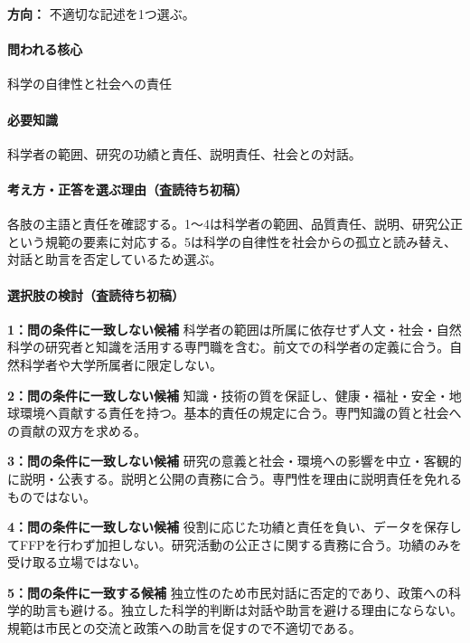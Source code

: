 \noindent\textbf{方向：} 不適切な記述を1つ選ぶ。\par

\paragraph{問われる核心} 科学の自律性と社会への責任

\paragraph{必要知識} 科学者の範囲、研究の功績と責任、説明責任、社会との対話。

\paragraph{考え方・正答を選ぶ理由（査読待ち初稿）} 各肢の主語と責任を確認する。1〜4は科学者の範囲、品質責任、説明、研究公正という規範の要素に対応する。5は科学の自律性を社会からの孤立と読み替え、対話と助言を否定しているため選ぶ。

\paragraph{選択肢の検討（査読待ち初稿）}\mbox{}\par

\noindent\textbf{1：問の条件に一致しない候補} 科学者の範囲は所属に依存せず人文・社会・自然科学の研究者と知識を活用する専門職を含む。前文での科学者の定義に合う。自然科学者や大学所属者に限定しない。\par

\noindent\textbf{2：問の条件に一致しない候補} 知識・技術の質を保証し、健康・福祉・安全・地球環境へ貢献する責任を持つ。基本的責任の規定に合う。専門知識の質と社会への貢献の双方を求める。\par

\noindent\textbf{3：問の条件に一致しない候補} 研究の意義と社会・環境への影響を中立・客観的に説明・公表する。説明と公開の責務に合う。専門性を理由に説明責任を免れるものではない。\par

\noindent\textbf{4：問の条件に一致しない候補} 役割に応じた功績と責任を負い、データを保存してFFPを行わず加担しない。研究活動の公正さに関する責務に合う。功績のみを受け取る立場ではない。\par

\noindent\textbf{5：問の条件に一致する候補} 独立性のため市民対話に否定的であり、政策への科学的助言も避ける。独立した科学的判断は対話や助言を避ける理由にならない。規範は市民との交流と政策への助言を促すので不適切である。\par

